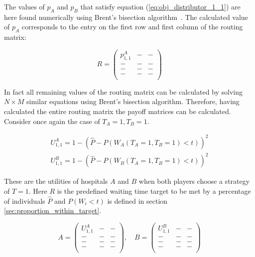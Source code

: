 The values of \(p_A\) and \(p_B\) that satisfy equation 
(\ref{eq:obj_distributor_1_1}) are here found numerically using Brent's 
bisection algorithm~\cite{brent1973algorithms}.
The calculated value of \(p_A\) corresponds to the entry on the first row and 
first column of the routing matrix:

\begin{equation}\label{eq:routing_matrix_1_1}
    R = 
    \begin{pmatrix}
        p_{1,1}^A & - & - \\
        - & - & - \\
        - & - & - \\
        - & - & - \\
    \end{pmatrix}
\end{equation}

In fact all remaining values of the routing matrix can be calculated by
solving \(N \times M\) similar equations using Brent's bisection algorithm.
Therefore, having calculated the entire routing matrix the payoff matrices can
be calculated.
Consider once again the case of \(T_A=1, T_B=1\). 


\begin{align}
    U_{1, 1}^A = 1 -\left( 
        \hat{P} - P(W_A(T_A=1, T_B=1) < t) 
    \right)^2 \nonumber
    \\
    U_{1, 1}^B = 1 -\left( 
        \hat{P} - P(W_B(T_A=1, T_B=1) < t) 
    \right)^2 \label{eq:payoff_entry_1_1}
\end{align}

These are the utilities of hospitals \(A\) and \(B\) when both players choose a
strategy of \(T = 1\).
Here \(R\) is the predefined waiting time target to be met by a percentage of 
individuals \( \hat{P} \) and \(P(W_i < t)\) is defined in section
\ref{sec:proportion_within_target}.

\begin{equation}\label{eq:payoff_matrices_1_1}
    A = 
    \begin{pmatrix}
        U_{1, 1}^A & - & - \\
        - & - & - \\
        - & - & - \\
        - & - & - \\
    \end{pmatrix}, \quad
    B = 
    \begin{pmatrix}
        U_{1, 1}^B & - & - \\
        - & - & - \\
        - & - & - \\
        - & - & - \\
    \end{pmatrix}
\end{equation}

